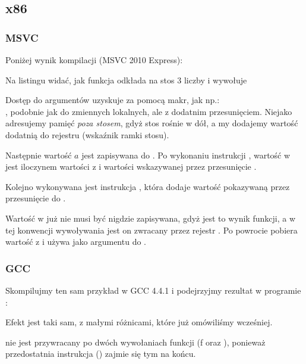 \subsection{x86}

\subsubsection{MSVC}

Poniżej wynik kompilacji (MSVC 2010 Express):




Na listingu widać, jak funkcja \main odkłada na stos 3 liczby i wywołuje 

Dostęp do argumentów \ttf uzyskuje za pomocą makr, jak np.:\\
,
podobnie jak do zmiennych lokalnych, ale z dodatnim przesunięciem.
Niejako adresujemy pamięć \emph{poza stosem}, gdyż stos rośnie w dół, a my dodajemy wartość dodatnią   do rejestru \EBP (wskaźnik ramki stosu).


Następnie wartość $a$ jest zapisywana do \EAX. Po wykonaniu instrukcji \IMUL, wartość w \EAX
jest iloczynem wartości z \EAX i wartości wskazywanej przez przesunięcie .

Kolejno wykonywana jest instrukcja \ADD, która dodaje wartość pokazywaną przez przesunięcie  do \EAX.

Wartość w \EAX już nie musi być nigdzie zapisywana, gdyż jest to wynik funkcji, a w tej konwencji wywoływania jest on zwracany przez rejestr \EAX.
Po powrocie  pobiera wartość z \EAX i używa jako argumentu do \printf.



\subsubsection{GCC}

Skompilujmy ten sam przykład w GCC 4.4.1 i podejrzyjmy rezultat w programie \IDA:



Efekt jest taki sam, z małymi różnicami, które już omówiliśmy wcześniej.

 nie jest przywracany po dwóch wywołaniach funkcji (f oraz \printf),
ponieważ przedostatnia instrukcja  () zajmie się tym na końcu.
